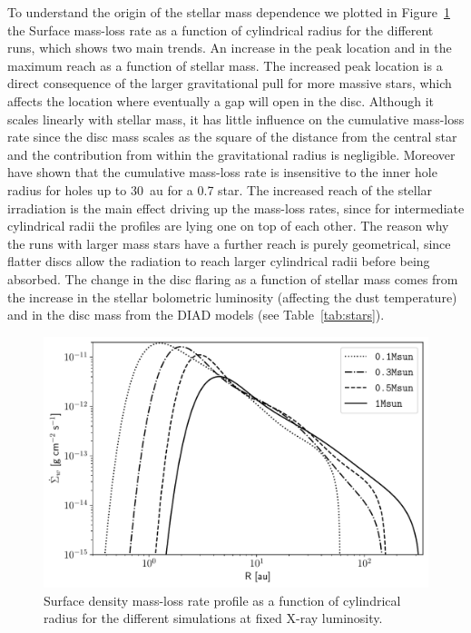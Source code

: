 \documentclass[usenatbib,useAMS,usedcolumn]{mnras}
\begin{document}
To understand the origin of the stellar mass dependence we plotted in Figure~\ref{fig:SigmadotLx} the Surface mass-loss rate as a function of cylindrical radius for the different runs, which shows two main trends. An increase in the peak location and in the maximum reach as a function of stellar mass. 
The increased peak location is a direct consequence of the larger gravitational pull for more massive stars, which affects the location where eventually a gap will open in the disc. Although it scales linearly with stellar mass, it has little influence on the cumulative mass-loss rate since the disc mass scales as the square of the distance from the central star and the contribution from within the gravitational radius is negligible. Moreover  have shown that the cumulative mass-loss rate is insensitive to the inner hole radius for holes up to \SI{30}{\astronomicalunit} for a \SI{0.7}{\solarmass} star.
The increased reach of the stellar irradiation is the main effect driving up the mass-loss rates, since for intermediate cylindrical radii the profiles are lying one on top of each other. The reason why the runs with larger mass stars have a further reach is purely geometrical, since flatter discs allow the radiation to reach larger cylindrical radii before being absorbed. The change in the disc flaring as a function of stellar mass comes from the increase in the stellar bolometric luminosity (affecting the dust temperature) and in the disc mass from the DIAD models (see Table~\ref{tab:stars}).

\begin{figure}
  \centering
  \includegraphics[width=\columnwidth]{Figure12}
  \caption{Surface density mass-loss rate profile as a function of cylindrical radius for the different simulations at fixed X-ray luminosity. \label{fig:SigmadotLx}}
\end{figure}
\end{document}
